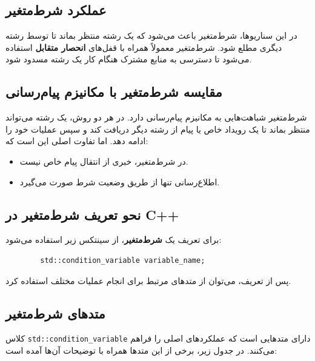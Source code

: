 \documentclass[12pt, a4paper]{report}
\begin{document}
\subsection{عملکرد شرط‌متغیر}

در این سناریوها، شرط‌متغیر باعث می‌شود که یک رشته منتظر بماند تا توسط رشته دیگری مطلع شود. شرط‌متغیر معمولاً همراه با قفل‌های \textbf{انحصار متقابل} استفاده می‌شود تا دسترسی به منابع مشترک هنگام کار یک رشته مسدود شود.

\subsection{مقایسه شرط‌متغیر با مکانیزم پیام‌رسانی}

شرط‌متغیر شباهت‌هایی به مکانیزم پیام‌رسانی دارد. در هر دو روش، یک رشته می‌تواند منتظر بماند تا یک رویداد خاص یا پیام از رشته دیگر دریافت کند و سپس عملیات خود را ادامه دهد. اما تفاوت اصلی این است که:

\begin{itemize}
	\item در شرط‌متغیر، خبری از انتقال پیام خاص نیست.
	\item اطلاع‌رسانی تنها از طریق وضعیت شرط صورت می‌گیرد.
\end{itemize}


\subsection{نحو تعریف شرط‌متغیر در C++}

برای تعریف یک \textbf{شرط‌متغیر}، از سینتکس زیر استفاده می‌شود:

\begin{LTR}
	\begin{lstlisting}
		std::condition_variable variable_name;
	\end{lstlisting}
\end{LTR}

پس از تعریف، می‌توان از متدهای مرتبط برای انجام عملیات مختلف استفاده کرد.

\subsection{متدهای شرط‌متغیر}

کلاس \texttt{std::condition\_variable} دارای متدهایی است که عملکردهای اصلی را فراهم می‌کنند. در جدول زیر، برخی از این متدها همراه با توضیحات آن‌ها آمده است:
\end{document}
